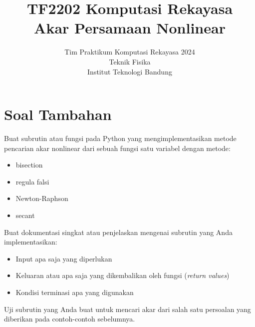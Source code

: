 



\title{%
{\small TF2202 Komputasi Rekayasa}\\
Akar Persamaan Nonlinear
}
\author{Tim Praktikum Komputasi Rekayasa 2024\\
Teknik Fisika\\
Institut Teknologi Bandung}
\date{}
\maketitle















\section{Soal Tambahan}

\begin{soal}
Buat subrutin atau fungsi pada Python yang mengimplementasikan metode pencarian akar nonlinear
dari sebuah fungsi satu variabel dengan metode:
\begin{itemize}
\item bisection
\item regula falsi
\item Newton-Raphson
\item secant
\end{itemize}
Buat dokumentasi singkat atau penjelaskan mengenai subrutin yang Anda implementasikan:
\begin{itemize}
\item Input apa saja yang diperlukan
\item Keluaran atau apa saja yang dikembalikan oleh fungsi (\textit{return values})
\item Kondisi terminasi apa yang digunakan
\end{itemize}
Uji subrutin yang Anda buat untuk mencari akar dari salah satu persoalan yang
diberikan pada contoh-contoh sebelumnya.
\end{soal}















